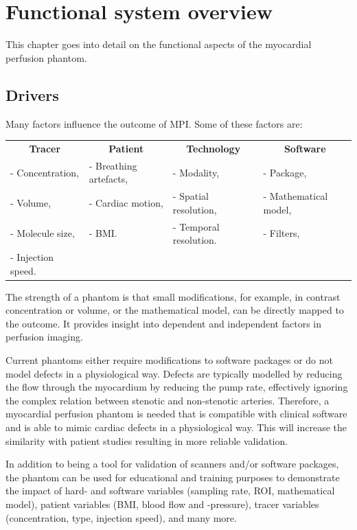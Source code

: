 \chapter{Functional system overview}
This chapter goes into detail on the functional aspects of the myocardial perfusion phantom.
\section{Drivers}
\label{sec:drivers}
Many factors influence the outcome of \ac{MPI}. Some of these factors are:

\begin{tabular}{llll}
 	\multicolumn{1}{c}{\textbf{Tracer}} & \multicolumn{1}{c}{\textbf{Patient}} & \multicolumn{1}{c}{\textbf{Technology}} & \multicolumn{1}{c}{\textbf{Software}} \\
		- Concentration, & - Breathing artefacts, & - Modality, & - Package, \\
		- Volume, & - Cardiac motion, &  - Spatial resolution, & - Mathematical model, \\
		- Molecule size, & - BMI. & - Temporal resolution. & - Filters,\\
		- Injection speed.  & & & \makecell[l]{- \acs{ROI}.}\\
\end{tabular}

The strength of a phantom is that small modifications, for example, in contrast concentration or volume, or the mathematical model,  can be directly mapped to the outcome. It provides insight into dependent and independent factors in perfusion imaging.

Current phantoms either require modifications to software packages or do not model defects in a physiological way. Defects are typically modelled by reducing the flow through the myocardium by reducing the pump rate, effectively ignoring the complex relation between stenotic and non-stenotic arteries. Therefore, a myocardial perfusion phantom is needed that is compatible with clinical software and is able to mimic cardiac defects in a physiological way. This will increase the similarity with patient studies resulting in more reliable validation.

In addition to being a tool for validation of scanners and/or software packages, the phantom can be used for educational and training purposes to demonstrate the impact of hard- and software variables (sampling rate, \acf{ROI}, mathematical model), patient variables (BMI, blood flow and -pressure), tracer variables (concentration, type, injection speed), and many more.

